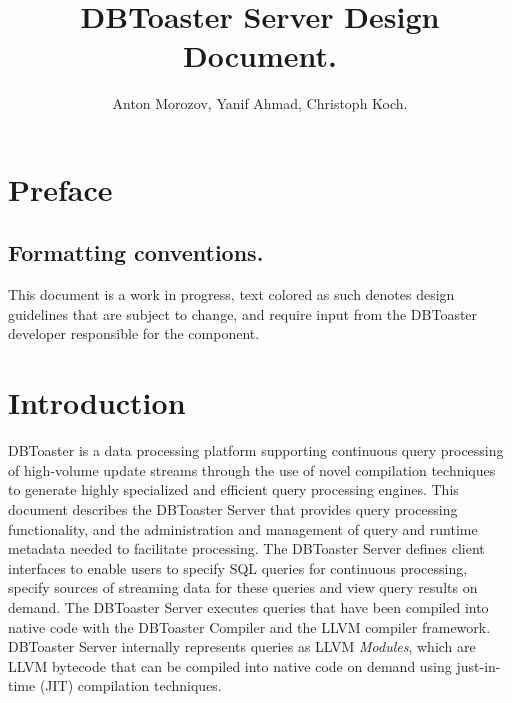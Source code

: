 \documentclass[14pt]{article}
\newcommand{\preliminary}[1]{\textcolor{prelim}{#1}}
\newcommand{\comment}[1]{}
\begin{document}
\title{DBToaster Server Design Document.}
\author{Anton Morozov, Yanif Ahmad, Christoph Koch.}
\maketitle
\tableofcontents

\newpage
\doublespacing

\section*{Preface}
\subsection*{Formatting conventions.}
This document is a work in progress, text colored \preliminary{as such}
denotes design guidelines that are subject to change, and require input from the
DBToaster developer responsible for the component.

 
\section{Introduction}
DBToaster is a data processing platform supporting continuous query processing of
high-volume update streams through the use of novel compilation techniques to
generate highly specialized and efficient query processing engines.
This document describes the DBToaster Server that provides query processing
functionality, and the administration and management of query and runtime
metadata needed to facilitate processing. The DBToaster Server defines client
interfaces to enable users to specify SQL queries for continuous processing,
specify sources of streaming data for these queries and view query results on
demand. The DBToaster Server executes queries that have been compiled into
native code with the DBToaster Compiler and the LLVM compiler
framework. DBToaster Server internally represents queries as LLVM
\textit{Modules}, which are LLVM bytecode that can be compiled into native code
on demand using just-in-time (JIT) compilation techniques.

\comment{
DBToaster Runtime is a system build based on DBToaster. Runtime provides a stand
alone interface for execution of user defined, DBToaster compiled queries over
specified update streams. Capabilities and usage of the system are demonstrated
on an example of AlgoTrader. AlgoTrader is a platform that simulates Stock
Exchange and serves as a testbed for automatic Trading Algorithms.
}
\end{document}
